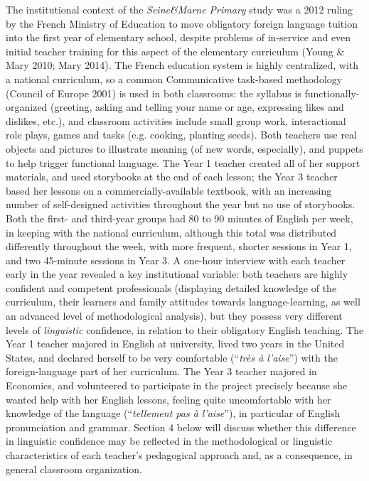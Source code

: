 \documentclass[11pt]{article}
\newenvironment{styleStandard}{\renewcommand\baselinestretch{1.25}\setlength\leftskip{0cm}\setlength\rightskip{0cm plus 1fil}\setlength\parindent{0cm}\setlength\parfillskip{0pt plus 1fil}\setlength\parskip{0in plus 1pt}\writerlistparindent\writerlistleftskip\leavevmode\normalfont\normalsize\writerlistlabel\ignorespaces}{\unskip\vspace{0.139in plus 0.0139in}\par}
\newcommand\writerlistleftskip{}
\newcommand\writerlistparindent{}
\newcommand\writerlistlabel{}
\begin{document}
\begin{styleStandard}
The institutional context of the \textit{Seine\&Marne Primary }study was a 2012 ruling by the French Ministry of Education to move obligatory foreign language tuition into the first year of elementary school, despite problems of in-service and even initial teacher training for this aspect of the elementary curriculum (Young \& Mary 2010; Mary 2014). The French education system is highly centralized, with a national curriculum, so a common Communicative task-based methodology (Council of Europe 2001) is used in both classrooms: the syllabus is functionally-organized (greeting, asking and telling your name or age, expressing likes and dislikes, etc.), and classroom activities include small group work, interactional role plays, games and tasks (e.g. cooking, planting seeds). Both teachers use real objects and pictures to illustrate meaning (of new words, especially), and puppets to help trigger functional language. The Year 1 teacher created all of her support materials, and used storybooks at the end of each lesson; the Year 3 teacher based her lessons on a commercially-available textbook, with an increasing number of self-designed activities throughout the year but no use of storybooks. Both the first- and third-year groups had 80 to 90 minutes of English per week, in keeping with the national curriculum, although this total was distributed differently throughout the week, with more frequent, shorter sessions in Year 1, and two 45-minute sessions in Year 3. A one-hour interview with each teacher early in the year revealed a key institutional variable: both teachers are highly confident and competent professionals (displaying detailed knowledge of the curriculum, their learners and family attitudes towards language-learning, as well an advanced level of methodological analysis), but they possess very different levels of \textit{linguistic }confidence, in relation to their obligatory English teaching. The Year 1 teacher majored in English at university, lived two years in the United States, and declared herself to be very comfortable (“\textit{très à l’aise}”) with the foreign-language part of her curriculum. The Year 3 teacher majored in Economics, and volunteered to participate in the project precisely because she wanted help with her English lessons, feeling quite uncomfortable with her knowledge of the language (“\textit{tellement pas à l’aise}”), in particular of English pronunciation and grammar. Section 4 below will discuss whether this difference in linguistic confidence may be reflected in the methodological or linguistic characteristics of each teacher’s pedagogical approach and, as a consequence, in general classroom organization.
\end{styleStandard}
\end{document}
